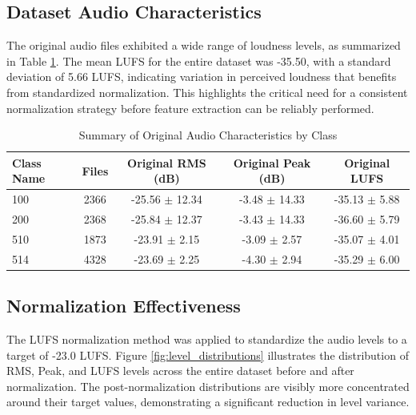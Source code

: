 \documentclass[12pt, a4paper]{article}
\begin{document}
\subsection{Dataset Audio Characteristics}
The original audio files exhibited a wide range of loudness levels, as summarized in Table \ref{tab:class_summary}. The mean LUFS for the entire dataset was -35.50, with a standard deviation of 5.66 LUFS, indicating variation in perceived loudness that benefits from standardized normalization. This highlights the critical need for a consistent normalization strategy before feature extraction can be reliably performed.

\begin{table}[h!]
\centering
\caption{Summary of Original Audio Characteristics by Class}
\label{tab:class_summary}
\begin{tabular}{@{}lcccc@{}}
\toprule
\textbf{Class Name} & \textbf{Files} & \textbf{Original RMS (dB)} & \textbf{Original Peak (dB)} & \textbf{Original LUFS} \\ \midrule
100 & 2366 & -25.56 $\pm$ 12.34 & -3.48 $\pm$ 14.33 & -35.13 $\pm$ 5.88 \\
200 & 2368 & -25.84 $\pm$ 12.37 & -3.43 $\pm$ 14.33 & -36.60 $\pm$ 5.79 \\
510 & 1873 & -23.91 $\pm$ 2.15 & -3.09 $\pm$ 2.57 & -35.07 $\pm$ 4.01 \\
514 & 4328 & -23.69 $\pm$ 2.25 & -4.30 $\pm$ 2.94 & -35.29 $\pm$ 6.00 \\ \bottomrule
\end{tabular}
\end{table}

\subsection{Normalization Effectiveness}
The LUFS normalization method was applied to standardize the audio levels to a target of -23.0 LUFS. Figure \ref{fig:level_distributions} illustrates the distribution of RMS, Peak, and LUFS levels across the entire dataset before and after normalization. The post-normalization distributions are visibly more concentrated around their target values, demonstrating a significant reduction in level variance.
\end{document}
